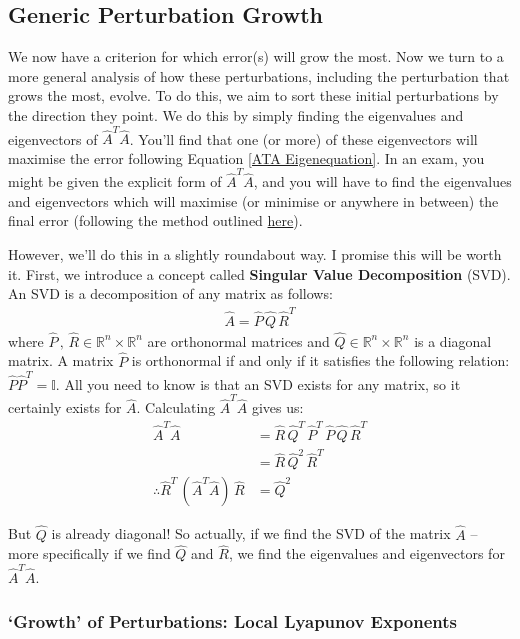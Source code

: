 \subsection{Generic Perturbation Growth}

We now have a criterion for which error(s) will grow the most. Now we turn to a more general analysis of how these perturbations, including the perturbation that grows the most, evolve. To do this, we aim to sort these initial perturbations by the direction they point. We do this by simply finding the eigenvalues and eigenvectors of $\hat{A}^T\hat{A}$. You'll find that one (or more) of these eigenvectors will maximise the error following Equation \ref{ATA Eigenequation}. In an exam, you might be given the explicit form of $\hat{A}^T\hat{A}$, and you will have to find the eigenvalues and eigenvectors which will maximise (or minimise or anywhere in between) the final error (following the method outlined \hyperref[Lin Alg]{here}).

However, we'll do this in a slightly roundabout way. I promise this will be worth it. First, we introduce a concept called \textbf{Singular Value Decomposition} (SVD). An SVD is a decomposition of any matrix as follows:
\begin{align*}
    \hat{A} = \hat{P}\, \hat{Q}\, \hat{R}^T
\end{align*}
where $\hat{P}\,,\,\hat{R}\in \mathbb{R}^n \times \mathbb{R}^n$ are orthonormal matrices and $\hat{Q}\in \mathbb{R}^n \times \mathbb{R}^n$ is a diagonal matrix. A matrix $\hat{P}$ is orthonormal if and only if it satisfies the following relation: $\hat{P}\hat{P}^T=\mathbb{I}$. All you need to know is that an SVD exists for any matrix, so it certainly exists for $\hat{A}$. Calculating $\hat{A}^T\hat{A}$ gives us:
\begin{align*}
    \hat{A}^T\hat{A}
    &=
    \hat{R}\,\hat{Q}^T\,\hat{P}^T\, \hat{P}\,\hat{Q}\,\hat{R}^T
    \\
    &=
    \hat{R}\,\hat{Q}^2\,\hat{R}^T
    \\
    \therefore
    \hat{R}^T \, \left( \hat{A}^T\hat{A} \right)\,\hat{R}
    &=
    \hat{Q}^2
\end{align*}

But $\hat{Q}$ is already diagonal! So actually, if we find the SVD of the matrix $\hat{A}$ – more specifically if we find $\hat{Q}$ and $\hat{R}$, we find the eigenvalues and eigenvectors for $\hat{A}^T\hat{A}$. 

\subsubsection{`Growth' of Perturbations: Local Lyapunov Exponents}

